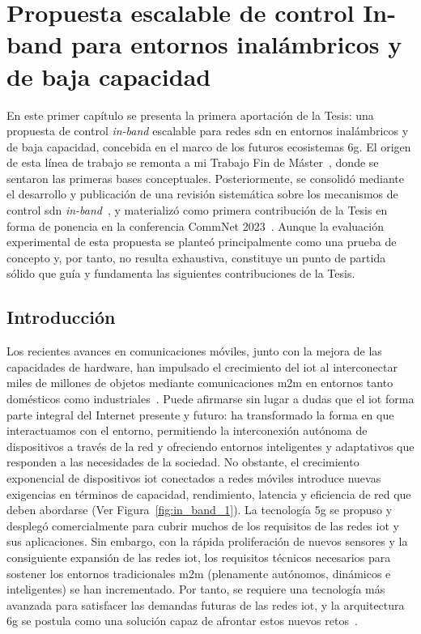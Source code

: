 \chapter{Propuesta escalable de control In-band para entornos inalámbricos y de baja capacidad}
\label{ch:propuestaInband}

En este primer capítulo se presenta la primera aportación de la Tesis: una propuesta de control \textit{in-band} escalable para redes \gls{sdn} en entornos inalámbricos y de baja capacidad, concebida en el marco de los futuros ecosistemas \gls{6g}. El origen de esta línea de trabajo se remonta a mi Trabajo Fin de Máster~\cite{carrascal2023diseno}, donde se sentaron las primeras bases conceptuales. Posteriormente, se consolidó mediante el desarrollo y publicación de una revisión sistemática sobre los mecanismos de control \gls{sdn} \textit{in-band}~\cite{carrascal2023comprehensive}, y materializó como primera contribución de la Tesis en forma de ponencia en la conferencia CommNet 2023~\cite{carrascal2023scalable}. Aunque la evaluación experimental de esta propuesta se planteó principalmente como una prueba de concepto y, por tanto, no resulta exhaustiva, constituye un punto de partida sólido que guía y fundamenta las siguientes contribuciones de la Tesis.

\section{Introducción}

Los recientes avances en comunicaciones móviles, junto con la mejora de las capacidades de hardware, han impulsado el crecimiento del \gls{iot} al interconectar miles de millones de objetos mediante comunicaciones \gls{m2m} en entornos tanto domésticos como industriales~\cite{Balaji2019}. Puede afirmarse sin lugar a dudas que el \gls{iot} forma parte integral del Internet presente y futuro: ha transformado la forma en que interactuamos con el entorno, permitiendo la interconexión autónoma de dispositivos a través de la red y ofreciendo entornos inteligentes y adaptativos que responden a las necesidades de la sociedad. No obstante, el crecimiento exponencial de dispositivos \gls{iot} conectados a redes móviles introduce nuevas exigencias en términos de capacidad, rendimiento, latencia y eficiencia de red que deben abordarse (Ver Figura~\ref{fig:in_band_1}). La tecnología \gls{5g} se propuso y desplegó comercialmente para cubrir muchos de los requisitos de las redes \gls{iot} y sus aplicaciones. Sin embargo, con la rápida proliferación de nuevos sensores y la consiguiente expansión de las redes \gls{iot}, los requisitos técnicos necesarios para sostener los entornos tradicionales \gls{m2m} (plenamente autónomos, dinámicos e inteligentes) se han incrementado. Por tanto, se requiere una tecnología más avanzada para satisfacer las demandas futuras de las redes \gls{iot}, y la arquitectura \gls{6g} se postula como una solución capaz de afrontar estos nuevos retos~\cite{Nguyen2022}.

